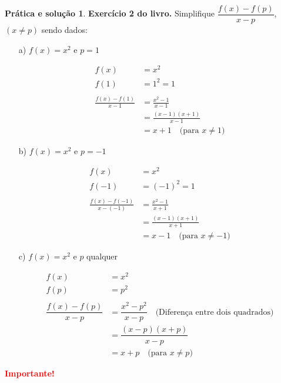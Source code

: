 \documentclass[12pt,openright,twoside,a4paper]{article}
\theoremstyle{definition}
\newtheorem{practice}{Prática e solução}[section]
\begin{document}
	\begin{practice}
		
		\textbf{Exercício 2 do livro.} Simplifique $\dfrac{f(x) - f(p)}{x - p}$, $(x \neq p)$ sendo dados:
		
		\begin{enumerate}
			\item[a)] $f(x) = x^2$ e $p = 1$
			
			\begin{align*}
				f(x) &= x^2 \\
				f(1) &= 1^2 = 1 \\
				\\
				\frac{f(x) - f(1)}{x - 1} &= \frac{x^2 - 1}{x - 1} \\
				&= \frac{(x - 1)(x + 1)}{x - 1} \\
				&= x + 1 \quad \text{(para } x \ne 1\text{)}
			\end{align*}
			
			\item[b)] $f(x) = x^2$ e $p = -1$
			
			\begin{align*}
				f(x) &= x^2 \\
				f(-1) &= (-1)^2 = 1 \\
				\\
				\frac{f(x) - f(-1)}{x - (-1)} &= \frac{x^2 - 1}{x + 1} \\
				&= \frac{(x - 1)(x + 1)}{x + 1} \\
				&= x - 1 \quad \text{(para } x \ne -1\text{)}
			\end{align*}
			
			\item[c)] $f(x) = x^2$ e $p$ qualquer
			
			\begin{align*}
				f(x) &= x^2 \\
				f(p) &= p^2 \\
				\\
				\dfrac{f(x) - f(p)}{x - p} &= \dfrac{x^2 - p^2}{x - p} \quad \text{(Diferença entre dois quadrados)}\\
				&= \dfrac{(x - p)(x + p)}{x - p} \\
				&= x + p \quad \text{(para } x \ne p\text{)}
			\end{align*}
			
		\end{enumerate}
		
		\begin{snugshade}
			\textbf{\textcolor{red}{Importante!}}
			

\end{snugshade}
\end{practice}
\end{document}
